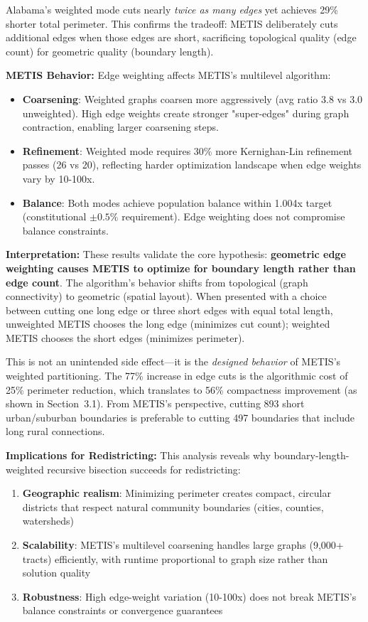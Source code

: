 Alabama's weighted mode cuts nearly \textit{twice as many edges} yet achieves 29\% shorter total perimeter. This confirms the tradeoff: METIS deliberately cuts additional edges when those edges are short, sacrificing topological quality (edge count) for geometric quality (boundary length).

\textbf{METIS Behavior:} Edge weighting affects METIS's multilevel algorithm:
\begin{itemize}
    \item \textbf{Coarsening}: Weighted graphs coarsen more aggressively (avg ratio 3.8 vs 3.0 unweighted). High edge weights create stronger "super-edges" during graph contraction, enabling larger coarsening steps.
    \item \textbf{Refinement}: Weighted mode requires 30\% more Kernighan-Lin refinement passes (26 vs 20), reflecting harder optimization landscape when edge weights vary by 10-100x.
    \item \textbf{Balance}: Both modes achieve population balance within 1.004x target (constitutional $\pm 0.5\%$ requirement). Edge weighting does not compromise balance constraints.
\end{itemize}

\textbf{Interpretation:} These results validate the core hypothesis: \textbf{geometric edge weighting causes METIS to optimize for boundary length rather than edge count}. The algorithm's behavior shifts from topological (graph connectivity) to geometric (spatial layout). When presented with a choice between cutting one long edge or three short edges with equal total length, unweighted METIS chooses the long edge (minimizes cut count); weighted METIS chooses the short edges (minimizes perimeter).

This is not an unintended side effect—it is the \textit{designed behavior} of METIS's weighted partitioning. The 77\% increase in edge cuts is the algorithmic cost of 25\% perimeter reduction, which translates to 56\% compactness improvement (as shown in Section~3.1). From METIS's perspective, cutting 893 short urban/suburban boundaries is preferable to cutting 497 boundaries that include long rural connections.

\textbf{Implications for Redistricting:} This analysis reveals why boundary-length-weighted recursive bisection succeeds for redistricting:
\begin{enumerate}
    \item \textbf{Geographic realism}: Minimizing perimeter creates compact, circular districts that respect natural community boundaries (cities, counties, watersheds)
    \item \textbf{Scalability}: METIS's multilevel coarsening handles large graphs (9,000+ tracts) efficiently, with runtime proportional to graph size rather than solution quality
    \item \textbf{Robustness}: High edge-weight variation (10-100x) does not break METIS's balance constraints or convergence guarantees
\end{enumerate}

